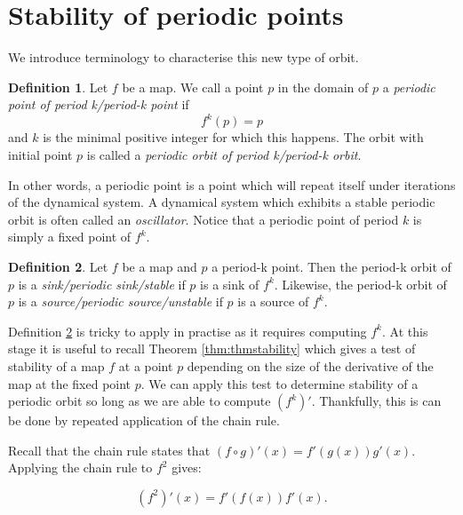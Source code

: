 \documentclass[
  a4paper,
  oneside,
  final]{krantz}
\theoremstyle{definition}
\newtheorem{definition}{Definition}[chapter]
\theoremstyle{definition}
\theoremstyle{definition}
\theoremstyle{definition}
\theoremstyle{remark}
\begin{document}
\hypertarget{stabilityperiodic}{%
\section{Stability of periodic points}\label{stabilityperiodic}}

We introduce terminology to characterise this new type of orbit.

\begin{definition}
\protect\hypertarget{def:periodicorbits}{}\label{def:periodicorbits}Let \(f\) be a map. We call a point \(p\) in the domain of \(p\) a \emph{periodic point of period k/period-k point} if \[f^k(p) = p\] and \(k\) is the minimal positive integer for which this happens. The orbit with initial point \(p\) is called a \emph{periodic orbit of period k/period-k orbit}.
\end{definition}

In other words, a periodic point is a point which will repeat itself under iterations of the dynamical system. A dynamical system which exhibits a stable periodic orbit is often called an \emph{oscillator}. Notice that a periodic point of period \(k\) is simply a fixed point of \(f^{k}\).

\begin{definition}
\protect\hypertarget{def:stabilityofperiodicorbits}{}\label{def:stabilityofperiodicorbits}Let \(f\) be a map and \(p\) a period-k point. Then the period-k orbit of \(p\) is a \emph{sink/periodic sink/stable} if \(p\) is a sink of \(f^{k}\). Likewise, the period-k orbit of \(p\) is a \emph{source/periodic source/unstable} if \(p\) is a source of \(f^{k}\).
\end{definition}

Definition \ref{def:stabilityofperiodicorbits} is tricky to apply in practise as it requires computing \(f^{k}\). At this stage it is useful to recall Theorem \ref{thm:thmstability} which gives a test of stability of a map \(f\) at a point \(p\) depending on the size of the derivative of the map at the fixed point \(p\). We can apply this test to determine stability of a periodic orbit so long as we are able to compute \((f^{k})'\). Thankfully, this is can be done by repeated application of the chain rule.

Recall that the chain rule states that \((f\circ g)'(x) = f'(g(x)) g'(x)\). Applying the chain rule to \(f^2\) gives:

\begin{equation}
(f^2)'(x) = f'(f(x)) f'(x). \label{eq:derivativeoff2}
\end{equation}
\end{document}

